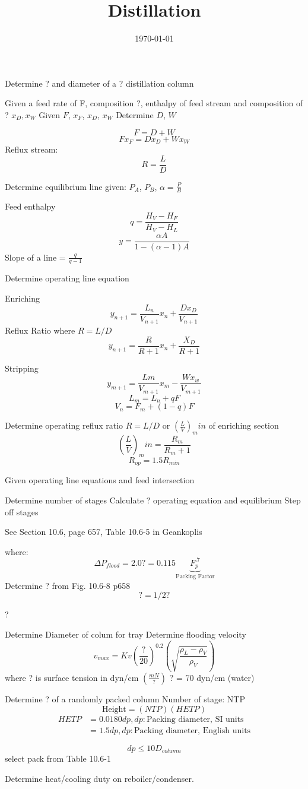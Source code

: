 \documentclass[11pt]{article}
\begin{document}
\title{Distillation}
\date{\today}
\maketitle

Determine ? and diameter of a ? distillation column

Given a feed rate of F, composition ?, enthalpy of feed stream and composition of ? $x_D, x_W$
Given $F$, $x_F$, $x_D$, $x_W$
Determine $D$, $W$

\[F = D+W\]
\[F x_F = D x_D + W x_W\]
Reflux stream:
\[R = \frac{L}{D}\]

Determine equilibrium line
given: $P_A$, $P_B$, $\alpha = \frac{P}{B}$

Feed enthalpy
\[q = \frac{H_V - H_F}{H_V-H_L}\]
\[y = \frac{\alpha A}{1-(\alpha-1)A}\]
Slope of a line = $\frac{q}{q-1}$

Determine operating line equation

Enriching
\[y_{n+1} = \frac{L_n}{V_{n+1}}x_n+\frac{Dx_D}{V_{n+1}}\]
Reflux Ratio where $R = L/D$
\[y_{n+1} = \frac{R}{R+1}x_n + \frac{X_D}{R+1}\]

Stripping
\[y_{m+1} = \frac{Lm}{V_{m+1}}x_m - \frac{Wx_w}{V_{m+1}}\]
\[L_m = L_n + qF\]
\[V_n = F_m + (1-q)F\]

Determine operating reflux ratio $R=L/D$ or $\left(\frac{L}{V}\right)_min$ of enriching section
\[\left(\frac{L}{V}\right)_min = \frac{R_m}{R_m+1}\]
\[R_{op} = 1.5 R_{min}\]

Given operating line equations and feed intersection

Determine number of stages
Calculate ? operating equation and equilibrium
Step off stages

See Section 10.6, page 657, Table 10.6-5 in Geankoplis

where: \[\Delta P_{flood} = 2.0 ? = 0.115 \underbrace{F_p^{.7}}_{\text{Packing Factor}}\]Determine ? from Fig. 10.6-8 p658
\[? = 1/2 ?\]

?

Determine Diameter of colum for tray
Determine flooding velocity
\[v_{max} = Kv\left(\frac{?}{20}\right)^{0.2}\left(\sqrt{\frac{\rho_L-\rho_V}{\rho_V}}\right)\]
where ? is surface tension in dyn/cm $\left(\frac{mN}{?}\right)$
? = 70 dyn/cm (water)

Determine ? of a randomly packed column
Number of stage: NTP
\[\text{Height} = (NTP)(HETP)\]
\begin{align}
HETP &= 0.0180 dp, dp: \text{Packing diameter, SI units}\\
     &= 1.5 dp, dp: \text{Packing diameter, English units}
\end{align}

\[dp \le 10 D_{column}\]
select pack from Table 10.6-1

Determine heat/cooling duty on reboiler/condenser.
\end{document}
